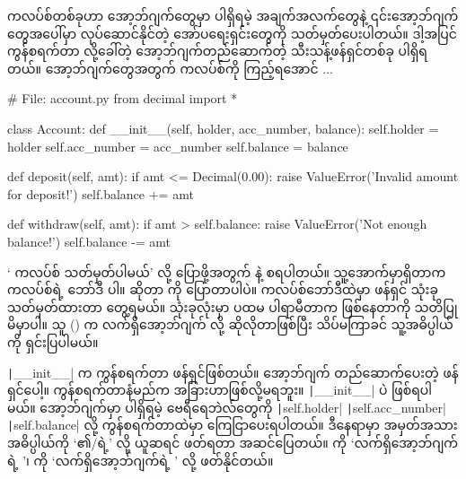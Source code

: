 ကလပ်စ်တစ်ခုဟာ အော့ဘ်ဂျက်တွေမှာ ပါရှိရမဲ့ အချက်အလက်တွေနဲ့ ၎င်းအော့ဘ်ဂျက်တွေအပေါ်မှာ လုပ်\allowbreak ဆောင်နိုင်တဲ့ အော်ပရေးရှင်းတွေကို သတ်မှတ်ပေးပါတယ်။ ဒါ့အပြင် ကွန်စရက်တာ  လို့ခေါ်တဲ့ အော့ဘ်ဂျက်တည်ဆောက်တဲ့ သီးသန့်ဖန်ရှင်တစ်ခု ပါရှိရတယ်။  အော့ဘ်ဂျက်တွေအတွက် ကလပ်စ်ကို ကြည့်ရအောင် $\ldots$ 


%
\begin{py}
# File: account.py
from decimal import *


class Account:
    def __init__(self, holder, acc_number, balance):
        self.holder = holder
        self.acc_number = acc_number
        self.balance = balance

    def deposit(self, amt):
        if amt <= Decimal(0.00):
            raise ValueError('Invalid amount for deposit!')
        self.balance += amt

    def withdraw(self, amt):
        if amt > self.balance:
            raise ValueError('Not enough balance!')
        self.balance -= amt
\end{py}
%

‘ ကလပ်စ် သတ်မှတ်ပါမယ်’ လို့ ပြောဖို့အတွက်  နဲ့ စရပါတယ်။ သူ့အောက်မှာရှိတာက  ကလပ်စ်ရဲ့ ဘော်ဒီ  ပါ။  ဆိုတာ  ကို ပြောတာပါပဲ။ ကလပ်စ်ဘော်ဒီထဲမှာ ဖန်ရှင် သုံးခု သတ်မှတ်ထားတာ တွေ့ရမယ်။ သုံးခုလုံးမှာ ပထမ ပါရာမီတာက  ဖြစ်နေတာကို သတိပြုမိမှာပါ။ သူ () က လက်ရှိအော့ဘ်ဂျက်  လို့ ဆိုလိုတာဖြစ်ပြီး သိပ်မကြာခင် သူ့အဓိပ္ပါယ်ကို ရှင်းပြပါမယ်။

\texttt|__init__|  က ကွန်စရက်တာ  ဖန်ရှင်ဖြစ်တယ်။ အော့ဘ်ဂျက် တည်ဆောက်ပေးတဲ့ ဖန်ရှင်ပေါ့။ ကွန်စရက်တာနံမည်က အခြားဟာဖြစ်လို့မရဘူး။ \texttt|__init__| ပဲ ဖြစ်ရပါမယ်။ အော့ဘ်ဂျက်မှာ ပါရှိရမဲ့ ဗေရီရေဘဲလ်တွေကို \texttt|self.holder|\fEn{,} \texttt|self.acc_number|\fEn{,} \texttt|self.balance| လို့ ကွန်စရက်တာထဲမှာ ကြေငြာပေးရပါတယ်။ ဒီနေရာမှာ  အမှတ်အသား အဓိပ္ပါယ်ကို ‘၏/ရဲ့’ လို့ ယူဆရင် ဖတ်ရတာ အဆင်ပြေတယ်။  ကို ‘လက်ရှိအော့ဘ်ဂျက်ရဲ့ ’၊  ကို ‘လက်ရှိအော့ဘ်ဂျက်ရဲ့ ’ လို့ ဖတ်နိုင်တယ်။

